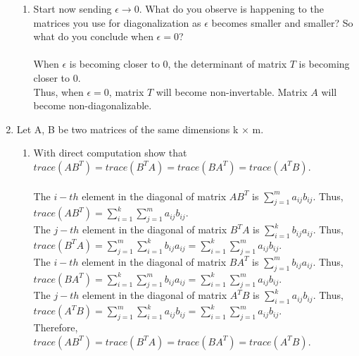 \documentclass[letter, 11pt]{article}
\begin{document}
\begin{enumerate}[wide = 0pt, label = \textbf{Problem \arabic*:}]
\begin{enumerate}
			\item {Start now sending $ \epsilon \to 0 $. What do
				you observe is happening to the matrices you use for diagonalization as $ \epsilon $ becomes smaller and smaller? So
				what do you conclude when $ \epsilon = 0 $?} \\
			\\
			When $ \epsilon $ is becoming closer to 0, the determinant of matrix $ T $ is becoming closer to 0. \\
			Thus, when $ \epsilon = 0 $, matrix $ T $ will become non-invertable. Matrix $ A $ will become non-diagonalizable.
		\end{enumerate}
		
		\item {Let A, B be two matrices of the same dimensions k × m.}
		\begin{enumerate}
			\item {With direct computation show that $ trace(AB^T ) = trace(B^T A) = trace(BA^T ) = trace(A^T B) $.} \\ \\
			The $ i-th $ element in the diagonal of matrix $ AB^T $ is $ \sum\limits_{j = 1}^{m} a_{ij}b_{ij}$. Thus, $ trace(AB^T) = \sum\limits_{i = 1}^{k}\sum\limits_{j = 1}^{m} a_{ij}b_{ij} $. \\
			The $ j-th $ element in the diagonal of matrix $ B^T A $ is $ \sum\limits_{i = 1}^{k} b_{ij}a_{ij}$. Thus, $ trace(B^T A) = \sum\limits_{j = 1}^{m}\sum\limits_{i = 1}^{k} b_{ij}a_{ij} = \sum\limits_{i = 1}^{k}\sum\limits_{j = 1}^{m} a_{ij}b_{ij}$. \\
			The $ i-th $ element in the diagonal of matrix $ BA^T $ is $ \sum\limits_{j = 1}^{m} b_{ij}a_{ij}$. Thus, $ trace(BA^T) = \sum\limits_{i = 1}^{k}\sum\limits_{j = 1}^{m} b_{ij}a_{ij} = \sum\limits_{i = 1}^{k}\sum\limits_{j = 1}^{m} a_{ij}b_{ij}$.  \\
			The $ j-th $ element in the diagonal of matrix $ A^T B $ is $ \sum\limits_{i = 1}^{k} a_{ij}b_{ij}$. Thus, $ trace(A^T B) = \sum\limits_{j = 1}^{m}\sum\limits_{i = 1}^{k} a_{ij}b_{ij} = \sum\limits_{i = 1}^{k}\sum\limits_{j = 1}^{m} a_{ij}b_{ij}$. \\
			Therefore, $ trace(AB^T ) = trace(B^T A) = trace(BA^T ) = trace(A^T B) $.
			

\end{enumerate}
\end{enumerate}
\end{document}
